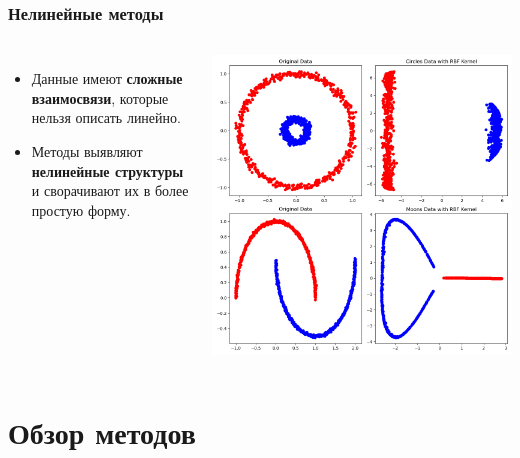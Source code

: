\begin{frame}
    \frametitle{Нелинейные методы}
    \begin{columns}
        \begin{itemize}
            \item Данные имеют \textbf{сложные взаимосвязи}, которые нельзя описать линейно.
            \item Методы выявляют \textbf{нелинейные структуры} и сворачивают их в более простую форму.
        \end{itemize}
        \begin{center}
            \includegraphics[width=1\textwidth]{../resources/methods/kpca.png}
        \end{center}
    \end{columns}
\end{frame}

\section{Обзор методов}

